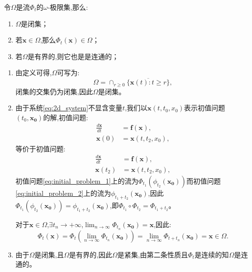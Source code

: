 \begin{prop}\label{prop:omega_limit_set}

    令$\Omega$是流$\Phi_t$的$\omega$-极限集,那么:
    \begin{enumerate}
        \item $\Omega$是闭集；
        \item 若$\mathbf{x}\in \Omega$,那么$\Phi_t(\mathbf{x})\in \Omega$；
        \item 若$\Omega$是有界的,则它也是是连通的；
    \end{enumerate}
\end{prop}
\begin{pf}

    \begin{enumerate}
        \item 由定义可得,$\Omega$可写为:
              \begin{equation}
                  \Omega=\cap_{r\geq 0}\overline{\{\mathbf{x}(t):t\geq r\}},
              \end{equation}
              闭集的交集仍为闭集,因此$\Omega$是闭集。
        \item 由于系统\ref{eq:2d_system}不显含变量$t$,我们以$\mathbf{x}(t,t_0,x_0)$表示初值问题$(t_0,\mathbf{x_0})$的解,初值问题:
              \begin{equation}\label{eq:initial_problem_1}
                  \begin{aligned}
                      \frac{d\mathbf{x}}{dt} & =\mathbf{f}(\mathbf{x}), \\
                      \mathbf{x}(0)          & =\mathbf{x}(t,t_2,x_0),
                  \end{aligned}
              \end{equation}
              等价于初值问题:
              \begin{equation}\label{eq:initial_problem_2}
                  \begin{aligned}
                      \frac{d\mathbf{x}}{dt} & =\mathbf{f}(\mathbf{x}), \\
                      \mathbf{x}(t_2)        & =\mathbf{x}(t,t_2,x_0),
                  \end{aligned}
              \end{equation}
              初值问题\ref{eq:initial_problem_1}上的流为$\Phi_{t_1}(\phi_{t_2}(\mathbf{x_0}))$而初值问题\ref{eq:initial_problem_2}上的流为$\phi_{t_1+t_2}(\mathbf{x_0})$,因此$\Phi_{t_1}(\phi_{t_2}(\mathbf{x_0}))=\phi_{t_1+t_2}(\mathbf{x_0})$,即$\Phi_{t_1}\circ\Phi_{t_2}=\Phi_{t_1+t_2}$。

              对于$\mathbf{x}\in\Omega$,$\exists t_n\to +\infty$,$\lim_{n\to\infty}\Phi_{t_n}(\mathbf{x_0})=\mathbf{x}$,因此:
              \begin{equation}
                  \Phi_t(\mathbf{x})=\Phi_{t}(\lim_{n\to\infty}\Phi_{t_n}(\mathbf{x_0}))=\lim_{n\to\infty}\Phi_{t+t_n}(\mathbf{x_0})=\mathbf{x}\in \Omega.
              \end{equation}
        \item 由于$\Omega$是闭集,且$\Omega$是有界的,因此$\Omega$是紧集,由第二条性质且$\Phi_t$是连续的知$\Omega$是连通的。
    \end{enumerate}
\end{pf}
